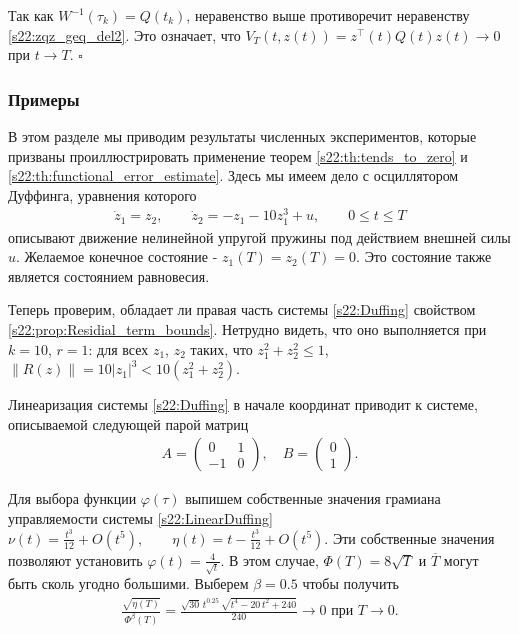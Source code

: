 \documentclass[../main.tex]{subfiles}
\begin{document}
 Так как $ W^{-1}(\tau_k) = Q(t_k)$, неравенство выше противоречит неравенству \eqref{s22:zqz_geq_del2}. 
 Это означает, что $V_{T}(t,z(t))  = z^{\top}(t)Q(t)z(t) \to 0$ при $t \to T$.
    \hfill $ \square $

\subsubsection{Примеры}
\label{s2:examples}

В этом разделе мы приводим результаты численных экспериментов, которые призваны проиллюстрировать применение теорем \ref{s22:th:tends_to_zero} и \ref{s22:th:functional_error_estimate}. 
Здесь мы имеем дело с осциллятором Дуффинга, уравнения которого
\begin{gather}\label{s22:Duffing}
    \dot{z}_1 = z_2, \qquad \dot{z}_2 = -z_1 - 10z_1^3 + u,\qquad 0\leqslant t 
    \leqslant T
\end{gather}
описывают движение нелинейной упругой пружины под действием внешней силы $u$. 
Желаемое конечное состояние - $z_1(T) = z_2(T) = 0$. 
Это состояние также является состоянием равновесия. 

Теперь проверим, обладает ли правая часть системы \eqref{s22:Duffing} свойством \ref{s22:prop:Residial_term_bounds}. 
Нетрудно видеть, что оно выполняется при $k = 10$, $r = 1$: для всех $z_1$, $z_2$ таких, что $z_1^2+z_2^2 \leqslant 1$, $\|R(z)\| = 10|z_1|^3 < 10 (z_1^2+z_2^2)$.

Линеаризация системы \eqref{s22:Duffing} в начале координат приводит к системе, описываемой следующей парой матриц
\begin{gather}\label{s22:LinearDuffing}
A = \begin{pmatrix} 0 & 1\\
                    -1 & 0
    \end{pmatrix}, \quad B = \begin{pmatrix}
    0\\
    1
    \end{pmatrix}.
\end{gather}

Для выбора функции $\varphi(\tau)$ выпишем собственные значения грамиана управляемости системы \eqref{s22:LinearDuffing} $\nu(t) = \frac{t^3}{12} + O(t^5), \qquad \eta(t) = t - \frac{t^3}{12}+ O(t^5)$.
Эти собственные значения позволяют установить $\varphi(t) = \frac{4}{\sqrt{t}}$. 
В этом случае, $\Phi(T) = 8\sqrt{T}$ и $\overline{T}$ могут быть сколь угодно большими. 
Выберем $\beta = 0.5$ чтобы получить 
\begin{gather*}
    \frac{\sqrt{\eta(T)}}{\Phi^\beta(T)} =  \frac{\sqrt{30}\,t^{0.25}\,\sqrt{t^4-20\,t^2+240}}{240} \to 0  \mbox{ при } T \to 0.
\end{gather*} 
\end{document}
